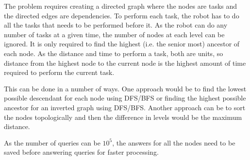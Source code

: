 \documentclass{article}
\begin{document}
	The problem requires creating a directed graph where the nodes are tasks and the directed edges are dependencies. To perform each task, the robot has to do all the tasks that needs to be performed before it. As the robot can do any number of tasks at a given time, the number of nodes at each level can be ignored. It is only required to find the highest (i.e. the senior most) ancestor of each node. As the distance and time to perform a task, both are units, so distance from the highest node to the current node is the highest amount of time required to perform the current task.
	
	This can be done in a number of ways. One approach would be to find the lowest possible descendant for each node using DFS/BFS or finding the highest possible ancestor for an inverted graph using DFS/BFS. Another approach can be to sort the nodes topologically and then the difference in levels would be the maximum distance.
	
	As the number of queries can be $10^{5}$, the answers for all the nodes need to be saved before answering queries for faster processing.
\end{document}
